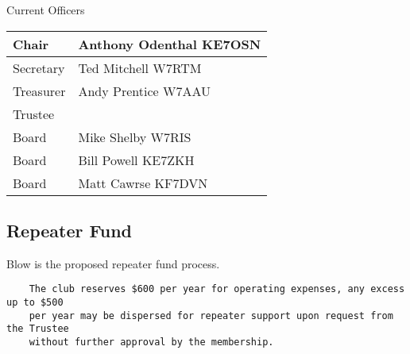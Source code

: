 \documentclass[letter,11pt]{extarticle}
\begin{document}

	Current Officers \\
	\begin{tabular}{|l|l|} \hline
		Chair & Anthony Odenthal KE7OSN \\ \hline
		Secretary & Ted Mitchell W7RTM \\ \hline
		Treasurer & Andy Prentice W7AAU \\ \hline
		Trustee &   \\ \hline
		Board & Mike Shelby W7RIS \\ \hline
		Board & Bill Powell KE7ZKH \\ \hline
		Board & Matt Cawrse KF7DVN \\ \hline
	\end{tabular}
	
	\subsection*{}
	
	\subsection*{Repeater Fund}
	Blow is the proposed  repeater fund process.
	\begin{lstlisting}
	The club reserves $600 per year for operating expenses, any excess up to $500 
	per year may be dispersed for repeater support upon request from the Trustee 
	without further approval by the membership.
	\end{lstlisting}
	
\end{document}
